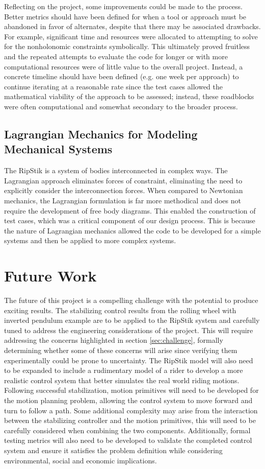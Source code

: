 Reflecting on the project, some improvements could be made to the process. 
Better metrics should have been defined for when a tool or approach must be abandoned in favor of alternates, despite that there may be associated drawbacks. 
For example, significant time and resources were allocated to attempting to solve for the nonholonomic constraints symbolically. 
This ultimately proved fruitless and the repeated attempts to evaluate the code for longer or with more computational resources were of little value to the overall project. 
Instead, a concrete timeline should have been defined (e.g. one week per approach) to continue iterating at a reasonable rate since the test cases allowed the mathematical viability of the approach to be assessed; instead, these roadblocks were often computational and somewhat secondary to the broader process.
\subsection{Lagrangian Mechanics for Modeling Mechanical Systems}
The RipStik is a system of bodies interconnected in complex ways. The Lagrangian approach eliminates forces of constraint, eliminating the need to explicitly consider the interconnection forces. When compared to Newtonian mechanics, the Lagrangian formulation is far more methodical and does not require the development of free body diagrams. This enabled the construction of test cases, which was a critical component of our design process. This is because the nature of Lagrangian mechanics allowed the code to be developed for a simple systems and then be applied to more complex systems.
\newpage
\section{Future Work}
The future of this project is a compelling challenge with the potential to produce exciting results. 
The stabilizing control results from the rolling wheel with inverted pendulum example are to be applied to the RipStik system and carefully tuned to address the engineering considerations of the project.
This will require addressing the concerns highlighted in section \ref{sec:challenge}, formally determining whether some of these concerns will arise since verifying them experimentally could be prone to uncertainty.
The RipStik model will also need to be expanded to include a rudimentary model of a rider to develop a more realistic control system that better simulates the real world riding motions.
Following successful stabilization, motion primitives will need to be developed for the motion planning problem, allowing the control system to move forward and turn to follow a path.
Some additional complexity may arise from the interaction between the stabilizing controller and the motion primitives, this will need to be carefully considered when combining the two components.
Additionally, formal testing metrics will also need to be developed to validate the completed control system and ensure it satisfies the problem definition while considering environmental, social and economic implications.
